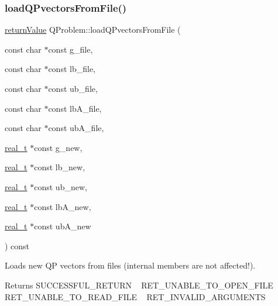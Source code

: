 \mbox{\label{class_q_problem_a987e8eaf2dd08828340f3f1012b22606}} 
\subsubsection{\texorpdfstring{load\+Q\+Pvectors\+From\+File()}{loadQPvectorsFromFile()}}
{\footnotesize\ttfamily \hyperlink{_message_handling_8hpp_a81d556f613bfbabd0b1f9488c0fa865e}{return\+Value} Q\+Problem\+::load\+Q\+Pvectors\+From\+File (\begin{DoxyParamCaption}\item[{const char $\ast$const}]{g\+\_\+file,  }\item[{const char $\ast$const}]{lb\+\_\+file,  }\item[{const char $\ast$const}]{ub\+\_\+file,  }\item[{const char $\ast$const}]{lb\+A\+\_\+file,  }\item[{const char $\ast$const}]{ub\+A\+\_\+file,  }\item[{\hyperlink{qp_o_a_s_e_s__wrapper_8h_a0d00e2b3dfadee81331bbb39068570c4}{real\+\_\+t} $\ast$const}]{g\+\_\+new,  }\item[{\hyperlink{qp_o_a_s_e_s__wrapper_8h_a0d00e2b3dfadee81331bbb39068570c4}{real\+\_\+t} $\ast$const}]{lb\+\_\+new,  }\item[{\hyperlink{qp_o_a_s_e_s__wrapper_8h_a0d00e2b3dfadee81331bbb39068570c4}{real\+\_\+t} $\ast$const}]{ub\+\_\+new,  }\item[{\hyperlink{qp_o_a_s_e_s__wrapper_8h_a0d00e2b3dfadee81331bbb39068570c4}{real\+\_\+t} $\ast$const}]{lb\+A\+\_\+new,  }\item[{\hyperlink{qp_o_a_s_e_s__wrapper_8h_a0d00e2b3dfadee81331bbb39068570c4}{real\+\_\+t} $\ast$const}]{ub\+A\+\_\+new }\end{DoxyParamCaption}) const\hspace{0.3cm}{\ttfamily [protected]}}

Loads new QP vectors from files (internal members are not affected!). \begin{DoxyReturn}{Returns}
S\+U\+C\+C\+E\+S\+S\+F\+U\+L\+\_\+\+R\+E\+T\+U\+RN ~\newline
 R\+E\+T\+\_\+\+U\+N\+A\+B\+L\+E\+\_\+\+T\+O\+\_\+\+O\+P\+E\+N\+\_\+\+F\+I\+LE ~\newline
 R\+E\+T\+\_\+\+U\+N\+A\+B\+L\+E\+\_\+\+T\+O\+\_\+\+R\+E\+A\+D\+\_\+\+F\+I\+LE ~\newline
 R\+E\+T\+\_\+\+I\+N\+V\+A\+L\+I\+D\+\_\+\+A\+R\+G\+U\+M\+E\+N\+TS 
\end{DoxyReturn}

